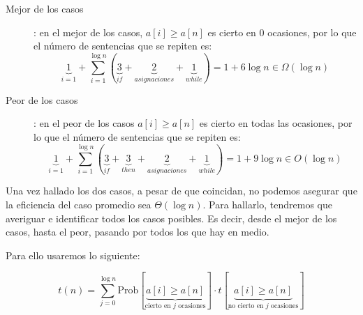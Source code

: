 \documentclass[10pt,a4paper,spanish]{report}
\theoremstyle{definition}
\theoremstyle{remark}
\begin{document}
\begin{description}
  \item [Mejor de los casos]: en el mejor de los casos, $a[i] \ge a[n]$ es cierto en 0 ocasiones, por lo que el número de sentencias que se repiten es:
  \begin{displaymath}
    \underbrace{1}_{i = 1} + \sum_{i = 1}^{\log n} (\underbrace{3}_{if} + \underbrace{2}_{asignaciones} + \underbrace{1}_{while}) = 1 + 6\log n \in \Omega(\log n)
  \end{displaymath}
  \item [Peor de los casos]: en el peor de los casos $a[i] \ge a[n]$ es cierto en todas las ocasiones, por lo que el número de sentencias que se repiten es:
  \begin{displaymath}
    \underbrace{1}_{i = 1} + \sum_{i = 1}^{\log n} (\underbrace{3}_{if} + \underbrace{3}_{then} + \underbrace{2}_{asignaciones} + \underbrace{1}_{while}) = 1 + 9\log n \in O(\log n)
  \end{displaymath}
\end{description}

Una vez hallado los dos casos, a pesar de que coincidan, no podemos asegurar que la eficiencia del caso promedio sea $\Theta(\log n)$. Para hallarlo, tendremos que averiguar e identificar todos los casos posibles. Es decir, desde el mejor de los casos, hasta el peor, pasando por todos los que hay en medio.

Para ello usaremos lo siguiente:

\begin{displaymath}
  t(n) = \sum_{j=0}^{\log n} \text{Prob}\left[\underbrace{a[i]\ge a[n]}_{\text{cierto en }j\text{ ocasiones}}\right] \cdot t\left[\underbrace{a[i]\ge a[n]}_{\text{no cierto en }j\text{ ocasiones}}\right]
\end{displaymath}
\end{document}
